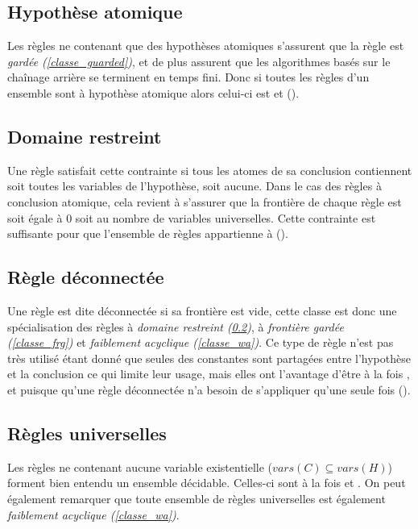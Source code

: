 \subsection{Hypothèse atomique}\label{classe_ah}
Les règles ne contenant que des hypothèses atomiques s'assurent que la règle est {\em
gardée (\ref{classe_guarded})}, et de plus assurent que les algorithmes basés sur le 
chaînage arrière se terminent en temps fini.
Donc si toutes les règles d'un ensemble sont à hypothèse atomique alors celui-ci est \gbts et
\fus (\cite{extending}).

\subsection{Domaine restreint}\label{classe_dr}
Une règle satisfait cette contrainte si tous les atomes de sa conclusion
contiennent soit toutes les variables de l'hypothèse, soit aucune.
Dans le cas des règles à conclusion atomique, cela revient à s'assurer que la frontière
de chaque règle est soit égale à 0 soit au nombre de variables universelles.
Cette contrainte est suffisante pour que l'ensemble de règles appartienne à \fus
(\cite{extending}).


\subsection{Règle déconnectée}\label{classe_disc}
Une règle est dite déconnectée si sa frontière est vide, cette classe est donc une
spécialisation des règles à {\em domaine restreint (\ref{classe_dr})}, à {\em frontière
gardée (\ref{classe_frg})} et {\em faiblement acyclique (\ref{classe_wa})}.
Ce type de règle n'est pas très utilisé étant donné que seules des constantes sont
partagées entre l'hypothèse et la conclusion ce qui limite leur usage, mais elles ont
l'avantage d'être à la fois \fes, \gbts et \fus puisque qu'une règle déconnectée n'a
besoin de s'appliquer qu'une seule fois (\cite{ontological11}).

\subsection{Règles universelles}\label{classe_rr}
Les règles ne contenant aucune variable existentielle ($vars(C) \subseteq vars(H)$) forment bien entendu
un ensemble décidable. Celles-ci sont à la fois \fes et \gbts. On peut également
remarquer que toute ensemble de règles universelles est également {\em faiblement
acyclique (\ref{classe_wa})}.


